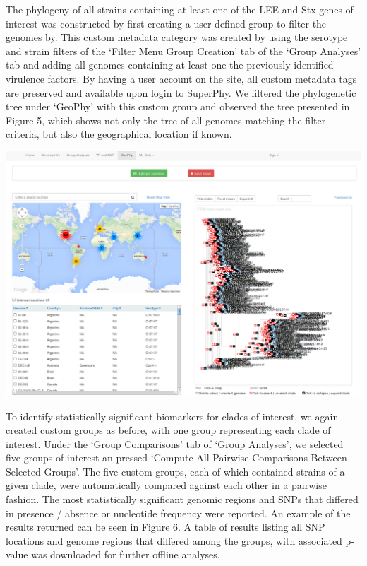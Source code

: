 \documentclass[doublespacing, linenumbers]{bmcart}
\begin{document}
The phylogeny of all strains containing at least one of the LEE and Stx genes of interest was constructed by first creating a user-defined group to filter the genomes by. This custom metadata category was created by using the serotype and strain filters of the `Filter Menu Group Creation' tab of the `Group Analyses' tab and adding all genomes containing at least one the previously identified virulence factors. By having a user account on the site, all custom metadata tags are preserved and available upon login to SuperPhy. We filtered the phylogenetic tree under `GeoPhy' with this custom group and observed the tree presented in Figure 5, which shows not only the tree of all genomes matching the filter criteria, but also the geographical location if known.

\includegraphics[width=\textwidth]{images/hazen_lineages.png}

To identify statistically significant biomarkers for clades of interest, we again created custom groups as before, with one group representing each clade of interest. Under the `Group Comparisons' tab of `Group Analyses', we selected five groups of interest an pressed `Compute All Pairwise Comparisons Between Selected Groups'. The five custom groups, each of which contained strains of a given clade, were automatically compared against each other in a pairwise fashion. The most statistically significant genomic regions and SNPs that differed in presence / absence or nucleotide frequency were reported. An example of the results returned can be seen in Figure 6. A table of results listing all SNP locations and genome regions that differed among the groups, with associated p-value was downloaded for further offline analyses.
\end{document}
